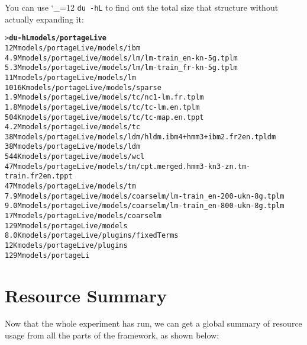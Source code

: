 \documentclass[11pt,letterpaper]{article}
\def\code{\begingroup\catcode`\_=12 \codex}
\newcommand{\codex}[1]{\texttt{#1}\endgroup}
\begin{document}
You can use \code{du -hL} to find out the total size that structure without
actually expanding it:
\begin{small}
\begin{alltt}
   > \textbf{du -hL models/portageLive}
   12M     models/portageLive/models/ibm
   4.9M    models/portageLive/models/lm/lm-train_en-kn-5g.tplm
   5.3M    models/portageLive/models/lm/lm-train_fr-kn-5g.tplm
   11M     models/portageLive/models/lm
   1016K   models/portageLive/models/sparse
   1.9M    models/portageLive/models/tc/nc1-lm.fr.tplm
   1.8M    models/portageLive/models/tc/tc-lm.en.tplm
   504K    models/portageLive/models/tc/tc-map.en.tppt
   4.2M    models/portageLive/models/tc
   38M     models/portageLive/models/ldm/hldm.ibm4+hmm3+ibm2.fr2en.tpldm
   38M     models/portageLive/models/ldm
   544K    models/portageLive/models/wcl
   47M     models/portageLive/models/tm/cpt.merged.hmm3-kn3-zn.tm-train.fr2en.tppt
   47M     models/portageLive/models/tm
   7.9M    models/portageLive/models/coarselm/lm-train_en-200-ukn-8g.tplm
   9.0M    models/portageLive/models/coarselm/lm-train_en-800-ukn-8g.tplm
   17M     models/portageLive/models/coarselm
   129M    models/portageLive/models
   8.0K    models/portageLive/plugins/fixedTerms
   12K     models/portageLive/plugins
   129M    models/portageLi
\end{alltt}
\end{small}


\section{Resource Summary}

Now that the whole experiment has run, we can get a global summary of resource
usage from all the parts of the framework, as shown below:
\end{document}
